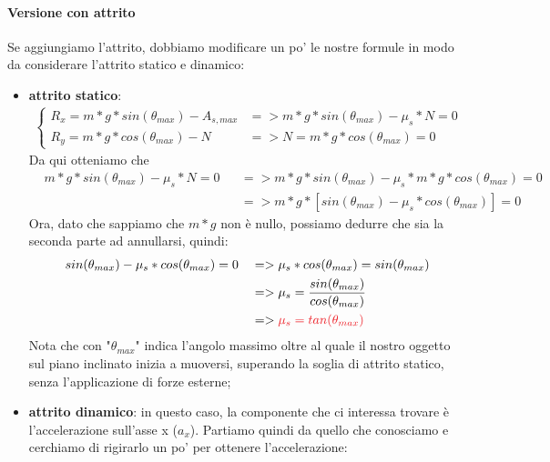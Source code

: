             \paragraph{Versione con attrito}
                Se aggiungiamo l'attrito, dobbiamo modificare un po' le nostre formule in modo da considerare l'attrito statico e dinamico:
                \begin{itemize}
                    \item \textbf{attrito statico}:
                    \begin{align*}
                        \begin{cases}
                            R_x = m*g*sin(\theta_{max})-A_{s, max} &=> m*g*sin(\theta_{max})-\mu_s * N= 0 \\
                            R_y = m*g*cos(\theta_{max})-N &=> N = m*g*cos(\theta_{max}) = 0
                        \end{cases}
                    \end{align*}
                    Da qui otteniamo che
                    \begin{align*}
                        &m*g*sin(\theta_{max})-\mu_s * N= 0 &&=> m*g*sin(\theta_{max})-\mu_s * m*g*cos(\theta_{max})= 0\\
                        & &&=> m*g*[sin(\theta_{max}) - \mu_s *cos(\theta_{max})] = 0
                    \end{align*}
                    Ora, dato che sappiamo che $m*g$ non è nullo, possiamo dedurre che sia la seconda parte ad annullarsi, quindi:
                    \begin{align*}
                        & sin(\theta_{max}) - \mu_s *cos(\theta_{max}) = 0 && => \mu_s *cos(\theta_{max}) = sin(\theta_{max})\\
                        & && => \mu_s = \frac{sin(\theta_{max})}{cos(\theta_{max})}\\
                        & && => \textcolor{Red}{\mu_s = tan(\theta_{max})}
                    \end{align*}
                    Nota che con "$\theta_{max}$" indica l'angolo massimo oltre al quale il nostro oggetto sul piano inclinato inizia a muoversi, superando la soglia di attrito statico, senza l'applicazione di forze esterne;
                    \item \textbf{attrito dinamico}: in questo caso, la componente che ci interessa trovare è l'accelerazione sull'asse x ($a_x$). Partiamo quindi da quello che conosciamo e cerchiamo di rigirarlo un po' per ottenere l'accelerazione:

\end{itemize}
